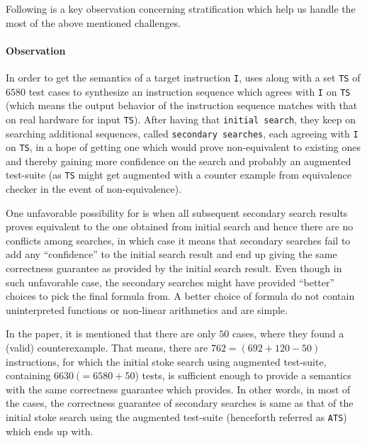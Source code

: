 Following is a key observation concerning stratification which help us handle
the most of the above mentioned challenges.

\paragraph{Observation} In order to get the semantics of a target instruction
{\tt I}, \Strata uses \Stoke along with a set {\tt TS} of $6580$ test cases to
synthesize an instruction sequence which agrees with {\tt I} on {\tt TS} (which
    means the output behavior of the instruction sequence matches with that on
    real hardware for input {\tt TS}). After having that {\tt initial search},
           they keep on searching  additional sequences, called {\tt secondary
             searches}, each agreeing with {\tt I} on {\tt TS}, in a hope of
             getting  one which would prove non-equivalent to existing ones and
             thereby gaining more confidence on the search and probably an
             augmented test-suite (as {\tt TS} might get augmented with a
                 counter example from equivalence checker in the event of
                 non-equivalence). 
      
      One unfavorable possibility for \Strata is when all subsequent secondary
      search results proves  equivalent to the one obtained from initial search
      and hence there are no conflicts among searches, in which case it  means
      that  secondary searches fail to add any ``confidence'' to the initial
      search result and end up giving the same correctness guarantee as provided
      by the initial search result. Even though in such unfavorable case, the
      secondary searches might have provided ``better'' choices to pick the
      final formula from. A better choice of formula do not contain
      uninterpreted functions or  non-linear arithmetics and are simple.  
    
   In the paper\cite{Heule2016a}, it is mentioned that there are only $50$
   cases, where they found a (valid) counterexample. That means, there are $762
   = (692 + 120 - 50)$ instructions, for which  the initial stoke search using
   augmented test-suite, containing $6630\ (= 6580 + 50$) tests,  is sufficient
   enough to provide a semantics with the same correctness guarantee which
   \Strata provides.   In other words, in  most of the cases, the correctness
   guarantee of secondary searches is same as that of the initial stoke search
   using the augmented test-suite (henceforth referred as {\tt ATS})  which
   \Strata ends up with. 
      
